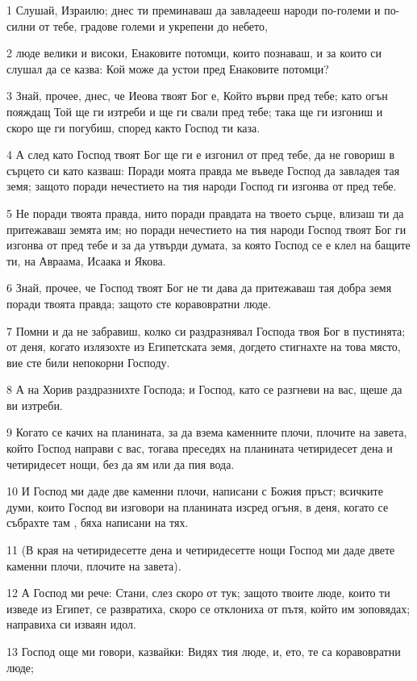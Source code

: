\par 1 Слушай, Израилю; днес ти преминаваш да завладееш народи по-големи и по-силни от тебе, градове големи и укрепени до небето,
\par 2 люде велики и високи, Енаковите потомци, които познаваш, и за които си слушал да се казва: Кой може да устои пред Енаковите потомци?
\par 3 Знай, прочее, днес, че Иеова твоят Бог е, Който върви пред тебе; като огън пояждащ Той ще ги изтреби и ще ги свали пред тебе; така ще ги изгониш и скоро ще ги погубиш, според както Господ ти каза.
\par 4 А след като Господ твоят Бог ще ги е изгонил от пред тебе, да не говориш в сърцето си като казваш: Поради моята правда ме въведе Господ да завладея тая земя; защото поради нечестието на тия народи Господ ги изгонва от пред тебе.
\par 5 Не поради твоята правда, нито поради правдата на твоето сърце, влизаш ти да притежаваш земята им; но поради нечестието на тия народи Господ твоят Бог ги изгонва от пред тебе и за да утвърди думата, за която Господ се е клел на бащите ти, на Авраама, Исаака и Якова.
\par 6 Знай, прочее, че Господ твоят Бог не ти дава да притежаваш тая добра земя поради твоята правда; защото сте коравовратни люде.
\par 7 Помни и да не забравиш, колко си раздразнявал Господа твоя Бог в пустинята; от деня, когато излязохте из Египетската земя, догдето стигнахте на това място, вие сте били непокорни Господу.
\par 8 А на Хорив раздразнихте Господа; и Господ, като се разгневи на вас, щеше да ви изтреби.
\par 9 Когато се качих на планината, за да взема каменните плочи, плочите на завета, който Господ направи с вас, тогава преседях на планината четиридесет дена и четиридесет нощи, без да ям или да пия вода.
\par 10 И Господ ми даде две каменни плочи, написани с Божия пръст; всичките думи, които Господ ви изговори на планината изсред огъня, в деня, когато се събрахте там , бяха написани на тях.
\par 11 (В края на четиридесетте дена и четиридесетте нощи Господ ми даде двете каменни плочи, плочите на завета).
\par 12 А Господ ми рече: Стани, слез скоро от тук; защото твоите люде, които ти изведе из Египет, се развратиха, скоро се отклониха от пътя, който им зоповядах; направиха си изваян идол.
\par 13 Господ още ми говори, казвайки: Видях тия люде, и, ето, те са коравовратни люде;
